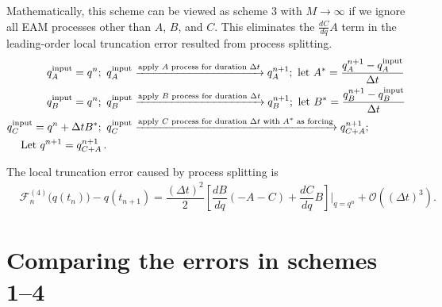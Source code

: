 \documentclass[12pt]{article}
\begin{document}
Mathematically, this scheme can be viewed as scheme 3 with $M\rightarrow\infty$
if we ignore all EAM processes other than $A$, $B$, and $C$.
This eliminates the $\frac{dC}{dq}A$ term in the leading-order local truncation error resulted from process splitting.
%
\begin{align*}
q^{\rm input}_{A} = q^n;\,\,\,
&q^{\rm input}_{A} \xrightarrow{\text{apply $A$ process for duration $\Delta t$}} q^{n+1}_{A};\,\,
\text{let}\,\, {A}^* = \dfrac{q^{n+1}_{A} - q^{\rm input}_{A}}{\Delta t} \\
%
q^{\rm input}_{B} = q^n;\,\,\, 
& q^{\rm input}_{B} \xrightarrow{\text{apply $B$ process for duration $\Delta t$}} q^{n+1}_{B};\,\, 
\text{let}\,\, {B}^* = \dfrac{q^{n+1}_{B} - q^{\rm input}_{B}}{\Delta t} \\
%
q^{\rm input}_{C} = q^n + \Delta t {B}^*;\,\,\, 
& q^{\rm input}_{C}\xrightarrow{\text{apply $C$ process for duration $\Delta t$ with $A^*$ as forcing} }q^{n+1}_{C+A};\,\, 
\\
%
\text{Let}\,\, q^{n+1} = q^{n+1}_{C+A} \,.
\end{align*}



The local truncation error caused by process splitting is
\begin{align}
&\mathcal{F}_n^{(4)}\Big(q(t_n)\Big) - q(t_{n+1}) 
= \dfrac{(\Delta t)^2}{2}\left[  \dfrac{dB}{dq}(-A-C) + \dfrac{dC}{dq}B\right]\bigg|_{q=q^n}
+\mathcal{O}\left( (\Delta t)^3\right).
\end{align}


\section{Comparing the errors in schemes 1--4}
\end{document}
